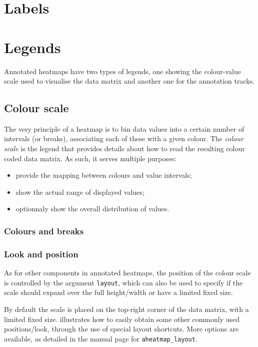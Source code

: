 \documentclass[a4paper]{article}\usepackage[]{graphicx}\usepackage[]{color}
\let\code=\texttt
\begin{document}
\section{Labels}

\section{Legends}
Annotated heatmaps have two types of legends, one showing the colour-value scale
used to visualise the data matrix and another one for the annotation tracks.

\subsection{Colour scale}
The very principle of a heatmap is to bin data values into a certain number
of intervals (or breaks), associating each of these with a given colour.
The \emph{colour scale} is the legend that provides details about how to read
the resulting colour coded data matrix.
As such, it serves multiple purposes:
\begin{itemize}
  \item provide the mapping between colours and value intervals;
  \item show the actual range of displayed values;
  \item optionnaly show the overall distribution of values.
\end{itemize}

\subsubsection{Colours and breaks}

\subsubsection{Look and position}
As for other components in annotated heatmaps, the position of the
colour scale is controlled by the argument \code{layout}, which can also be used
to specify if the scale should expand over the full height/width or have a
limited fixed size.

By default the scale is placed on the top-right corner of the data matrix, with
a limited fixed size.
 illustrates how to easily obtain some other commonly
used positions/look, through the use of special layout shortcuts.
More options are available, as detailed in the manual page for
\code{aheatmap\_layout}.
\end{document}
